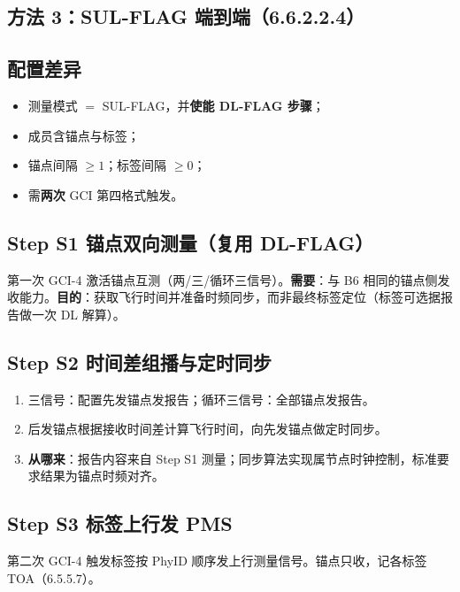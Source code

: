 \documentclass[11pt,a4paper]{ctexart}
\begin{document}
\subsection{方法 3：SUL-FLAG 端到端（6.6.2.2.4）}

\subsection{配置差异}

\begin{itemize}[nosep]
  \item 测量模式 $=$ SUL-FLAG，并\textbf{使能 DL-FLAG 步骤}；
  \item 成员含锚点与标签；
  \item 锚点间隔 $\ge 1$；标签间隔 $\ge 0$；
  \item 需\textbf{两次} GCI 第四格式触发。
\end{itemize}

\subsection{Step S1 锚点双向测量（复用 DL-FLAG）}

第一次 GCI-4 激活锚点互测（两/三/循环三信号）。\textbf{需要}：与 B6 相同的锚点侧发收能力。\textbf{目的}：获取飞行时间并准备时频同步，而非最终标签定位（标签可选据报告做一次 DL 解算）。

\subsection{Step S2 时间差组播与定时同步}

\begin{enumerate}
  \item 三信号：配置先发锚点发报告；循环三信号：全部锚点发报告。
  \item 后发锚点根据接收时间差计算飞行时间，向先发锚点做定时同步。
  \item \textbf{从哪来}：报告内容来自 Step S1 测量；同步算法实现属节点时钟控制，标准要求结果为锚点时频对齐。
\end{enumerate}

\subsection{Step S3 标签上行发 PMS}

第二次 GCI-4 触发标签按 PhyID 顺序发上行测量信号。锚点只收，记各标签 TOA（6.5.5.7）。
\end{document}
